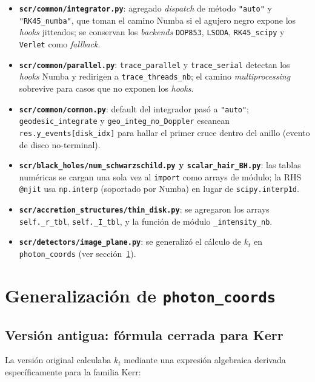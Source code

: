 \documentclass[11pt,a4paper]{article}
\begin{document}
\begin{itemize}
  \item \textbf{\texttt{scr/common/integrator.py}}: agregado \emph{dispatch}
        de método \verb|"auto"| y \verb|"RK45_numba"|, que toman el camino
        Numba si el agujero negro expone los \emph{hooks} jitteados; se
        conservan los \emph{backends} \verb|DOP853|, \verb|LSODA|,
        \verb|RK45_scipy| y \verb|Verlet| como \emph{fallback}.
  \item \textbf{\texttt{scr/common/parallel.py}}: \texttt{trace\_parallel}
        y \texttt{trace\_serial} detectan los \emph{hooks} Numba y
        redirigen a \texttt{trace\_threads\_nb}; el camino
        \emph{multiprocessing} sobrevive para casos que no exponen
        los \emph{hooks}.
  \item \textbf{\texttt{scr/common/common.py}}: default del integrador
        pasó a \verb|"auto"|; \texttt{geodesic\_integrate} y
        \texttt{geo\_integ\_no\_Doppler} escanean
        \texttt{res.y\_events[disk\_idx]} para hallar el primer cruce
        dentro del anillo (evento de disco no-terminal).
  \item \textbf{\texttt{scr/black\_holes/num\_schwarzschild.py} y
        \texttt{scalar\_hair\_BH.py}}: las tablas numéricas se cargan
        una sola vez al \texttt{import} como arrays de módulo; la RHS
        \texttt{@njit} usa \texttt{np.interp} (soportado por Numba) en
        lugar de \texttt{scipy.interp1d}.
  \item \textbf{\texttt{scr/accretion\_structures/thin\_disk.py}}: se
        agregaron los arrays \texttt{self.\_r\_tbl},
        \texttt{self.\_I\_tbl}, y la función de módulo
        \texttt{\_intensity\_nb}.
  \item \textbf{\texttt{scr/detectors/image\_plane.py}}: se generalizó el
        cálculo de $k_t$ en \texttt{photon\_coords} (ver
        sección~\ref{sec:photon_coords}).
\end{itemize}

\section{Generalización de \texttt{photon\_coords}}
\label{sec:photon_coords}

\subsection{Versión antigua: fórmula cerrada para Kerr}

La versión original calculaba $k_t$ mediante una expresión algebraica
derivada específicamente para la familia Kerr:
\end{document}
